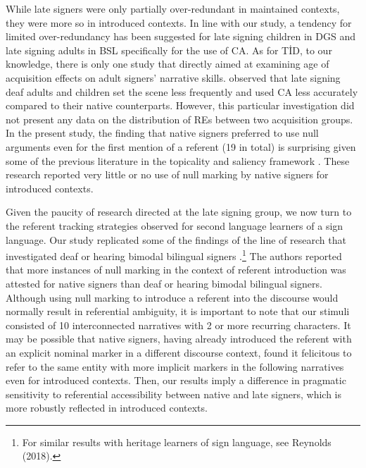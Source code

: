 \documentclass[review]{elsarticle} %
\begin{document}
While late signers were only partially over-redundant in maintained
contexts, they were more so in introduced contexts. In line with our
study, a tendency for limited over-redundancy has been suggested for
late signing children in DGS \citep{becker2009} and late signing adults
in BSL specifically for the use of CA\citep{cormier2013}. As for TİD, to
our knowledge, there is only one study \citep{gur2018} that directly
aimed at examining age of acquisition effects on adult signers'
narrative skills. \citet{gur2018} observed that late signing deaf adults
and children set the scene less frequently and used CA less accurately
compared to their native counterparts. However, this particular
investigation did not present any data on the distribution of REs
between two acquisition groups. In the present study, the finding that
native signers preferred to use null arguments even for the first
mention of a referent (19 in total) is surprising given some of the
previous literature in the topicality and saliency framework
\citep{cormier2013, swabey2002}. These research reported very little or
no use of null marking by native signers for introduced contexts.

Given the paucity of research directed at the late signing group, we now
turn to the referent tracking strategies observed for second language
learners of a sign language. Our study replicated some of the findings
of the line of research that investigated deaf or hearing bimodal
bilingual signers
\citep{bel2015, frederiksen2019}.\footnote{For similar results with heritage learners of sign language, see Reynolds (2018).}
The authors reported that more instances of null marking in the context
of referent introduction was attested for native signers than deaf or
hearing bimodal bilingual signers. Although using null marking to
introduce a referent into the discourse would normally result in
referential ambiguity, it is important to note that our stimuli
consisted of 10 interconnected narratives with 2 or more recurring
characters. It may be possible that native signers, having already
introduced the referent with an explicit nominal marker in a different
discourse context, found it felicitous to refer to the same entity with
more implicit markers in the following narratives even for introduced
contexts. Then, our results imply a difference in pragmatic sensitivity
to referential accessibility between native and late signers, which is
more robustly reflected in introduced contexts.
\end{document}
